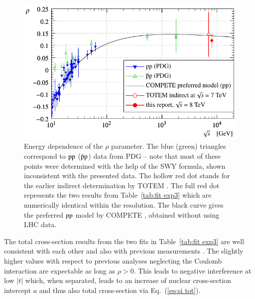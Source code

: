 \begin{figure}
\begin{center}
\includegraphics{fig/rho_s.pdf}
\caption{Energy dependence of the $\rho$ parameter. The blue (green) triangles correspond to $\rm pp$ ($\rm \bar pp$) data from PDG \cite{pdg} -- note that most of these points were determined with the help of the SWY formula, shown inconsistent with the presented data. The hollow red dot stands for the earlier indirect determination by TOTEM \cite{epl101-tot}. The full red dot represents the two results from Table~\ref{tab:fit exp3} which are numerically identical within the resolution. The black curve gives the preferred $\rm pp$ model by COMPETE \cite{compete}, obtained without using LHC data.
}%
\label{fig:rho cmp exp3}
\end{center}
\end{figure}


The total cross-section results from the two fits in Table~\ref{tab:fit exp3} are well consistent with each other and also with previous measurements \cite{8tev-90m,epl101-el}. The slightly higher values with respect to previous analyses neglecting the Coulomb interaction are expectable as long as $\rho > 0$. This leads to negative interference at low $|t|$ which, when separated, leads to an increase of nuclear cross-section intercept $a$ and thus also total cross-section via Eq.~(\ref{eq:si tot}).


